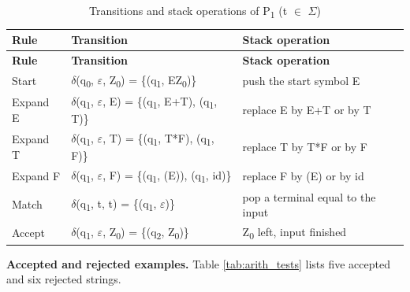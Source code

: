 \documentclass[12pt,a4paper]{article}
\begin{document}
{\footnotesize
\begin{longtable}{|>{\raggedright\arraybackslash}p{}|>{\raggedright\arraybackslash}p{}|>{\raggedright\arraybackslash}p{}|}
\caption[Transitions and stack operations of P1 (t \ensuremath{\in} \ensuremath{\Sigma})]{Transitions and stack operations of P\textsubscript{1} (t \ensuremath{\in} \ensuremath{\Sigma})}\label{tab:arith_delta}\\
\hline
\rowcolor{hdr}\textbf{Rule} & \textbf{Transition} & \textbf{Stack operation}\\ \hline
\endfirsthead
\hline
\rowcolor{hdr}\textbf{Rule} & \textbf{Transition} & \textbf{Stack operation}\\ \hline
\endhead
Start & \ensuremath{\delta}(q\textsubscript{0}, \ensuremath{\varepsilon}, Z\textsubscript{0}) = \{(q\textsubscript{1}, EZ\textsubscript{0})\} & push the start symbol E\\ \hline
Expand E & \ensuremath{\delta}(q\textsubscript{1}, \ensuremath{\varepsilon}, E) = \{(q\textsubscript{1}, E+T), (q\textsubscript{1}, T)\} & replace E by E+T or by T\\ \hline
Expand T & \ensuremath{\delta}(q\textsubscript{1}, \ensuremath{\varepsilon}, T) = \{(q\textsubscript{1}, T*F), (q\textsubscript{1}, F)\} & replace T by T*F or by F\\ \hline
Expand F & \ensuremath{\delta}(q\textsubscript{1}, \ensuremath{\varepsilon}, F) = \{(q\textsubscript{1}, (E)), (q\textsubscript{1}, id)\} & replace F by (E) or by id\\ \hline
Match & \ensuremath{\delta}(q\textsubscript{1}, t, t) = \{(q\textsubscript{1}, \ensuremath{\varepsilon})\} & pop a terminal equal to the input\\ \hline
Accept & \ensuremath{\delta}(q\textsubscript{1}, \ensuremath{\varepsilon}, Z\textsubscript{0}) = \{(q\textsubscript{2}, Z\textsubscript{0})\} & Z\textsubscript{0} left, input finished\\ \hline
\end{longtable}}

\textbf{Accepted and rejected examples.} Table \ref{tab:arith_tests} lists five accepted and six rejected strings.
\end{document}
